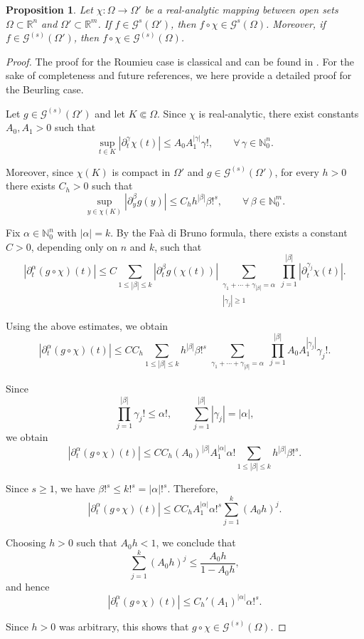 \documentclass[11pt,reqno]{amsart}
\numberwithin{equation}{section}
\newtheorem{proposition}[theorem]{Proposition}
\begin{document}
	\begin{proposition}
		Let $\chi:\Omega \to \Omega'$ be a real-analytic mapping between open sets
		$\Omega \subset \mathbb{R}^n$ and $\Omega' \subset \mathbb{R}^m$.
		If $f \in \mathscr{G}^s(\Omega')$, then $f \circ \chi \in \mathscr{G}^s(\Omega)$.
		Moreover, if $f \in \mathscr{G}^{(s)}(\Omega')$, then
		$f \circ \chi \in \mathscr{G}^{(s)}(\Omega)$.
	\end{proposition}
	
	
	\begin{proof}
		The proof for the
		Roumieu case is classical and can be found in \cite[Proposition~1.4.6]{Rod_Gevrey}. For the sake of completeness and future references,
		we here provide a detailed proof for the Beurling case.
		
		Let $g \in \mathscr{G}^{(s)}(\Omega')$ and let $K \Subset \Omega$. Since $\chi$ is real-analytic, there exist constants $A_0,A_1>0$ such that
		\[
		\sup_{t\in K} |\partial_t^\gamma \chi(t)| \leq A_0 A_1^{|\gamma|} \gamma!,
		\qquad \forall\, \gamma \in \mathbb{N}_0^n.
		\]
		
		Moreover, since $\chi(K)$ is compact in $\Omega'$ and $g \in \mathscr{G}^{(s)}(\Omega')$, for every $h>0$ there exists $C_h>0$ such that
		\[
		\sup_{y\in \chi(K)} |\partial_y^\beta g(y)| \leq C_h h^{|\beta|} \beta!^s,
		\qquad \forall\, \beta \in \mathbb{N}_0^m.
		\]
		
		Fix $\alpha \in \mathbb{N}_0^n$ with $|\alpha|=k$. By the Faà di Bruno formula, there exists a constant $C>0$, depending only on $n$ and $k$, such that
		\[
		|\partial_t^\alpha (g\circ\chi)(t)|
		\leq C
		\sum_{1 \leq |\beta| \leq k}
		|\partial_t^\beta g(\chi(t))|
		\sum_{\substack{\gamma_1+\cdots+\gamma_{|\beta|}=\alpha\\ |\gamma_j|\geq 1}}
		\prod_{j=1}^{|\beta|}
		|\partial_t^{\gamma_j} \chi(t)|.
		\]
		
		Using the above estimates, we obtain
		\[
		|\partial_t^\alpha (g\circ\chi)(t)|
		\leq C C_h
		\sum_{1 \leq |\beta| \leq k}
		h^{|\beta|} \beta!^s
		\sum_{\substack{\gamma_1+\cdots+\gamma_{|\beta|}=\alpha}}
		\prod_{j=1}^{|\beta|}
		A_0 A_1^{|\gamma_j|} \gamma_j!.
		\]
		
		Since
		\[
		\prod_{j=1}^{|\beta|} \gamma_j! \leq \alpha!,
		\qquad
		\sum_{j=1}^{|\beta|} |\gamma_j| = |\alpha|,
		\]
		we obtain
		\[
		|\partial_t^\alpha (g\circ\chi)(t)|
		\leq C C_h
		(A_0)^{|\beta|}
		A_1^{|\alpha|}
		\alpha!
		\sum_{1 \leq |\beta| \leq k}
		h^{|\beta|} \beta!^s.
		\]
		
		Since $s \geq 1$, we have $\beta!^s \leq k!^s = |\alpha|!^s$. Therefore,
		\[
		|\partial_t^\alpha (g\circ\chi)(t)|
		\leq C C_h
		A_1^{|\alpha|}
		\alpha!^s
		\sum_{j=1}^{k} (A_0 h)^j.
		\]
		
		Choosing $h>0$ such that $A_0 h < 1$, we conclude that
		\[
		\sum_{j=1}^{k} (A_0 h)^j \leq \frac{A_0 h}{1-A_0 h},
		\]
		and hence
		\[
		|\partial_t^\alpha (g\circ\chi)(t)|
		\leq C_h'
		(A_1)^{|\alpha|}
		\alpha!^s.
		\]
		
		Since $h>0$ was arbitrary, this shows that $g\circ\chi \in \mathscr{G}^{(s)}(\Omega)$.
	\end{proof}
	
\end{document}
